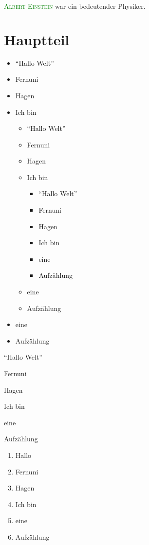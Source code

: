 \documentclass[12pt,ngerman,parskip=full]{scrreprt}
\newcommand{\person}[1]{\textsc{\textcolor{green}{#1}}}
\begin{document}
\person{Albert Einstein} war ein bedeutender Physiker.

\chapter{Hauptteil}\label{cha:hauptteil}

\blindtext[2]  

\newpage

\begin{itemize}
	\item \enquote{Hallo Welt}
	\item Fernuni
	\item Hagen
	\item Ich bin
	
	\begin{itemize}
	\item \enquote{Hallo Welt}
	\item Fernuni
	\item Hagen
	\item Ich bin
	
	\begin{itemize}
	\item \enquote{Hallo Welt}
	\item Fernuni
	\item Hagen
	\item Ich bin
	\item eine 
	\item Aufzählung
\end{itemize}

	\item eine 
	\item Aufzählung
\end{itemize}
	
	
	\item eine 
	\item Aufzählung
\end{itemize}

\begin{compactitem}[$\Rightarrow$]
	\item \enquote{Hallo Welt}
	\item Fernuni
	\item Hagen
	\item Ich bin
	\item eine 
	\item Aufzählung
\end{compactitem}

\begin{enumerate}[I]
	\item Hallo 
	\item Fernuni
	\item Hagen
	\item Ich bin
	\item eine 
	\item Aufzählung
\end{enumerate}
\end{document}
